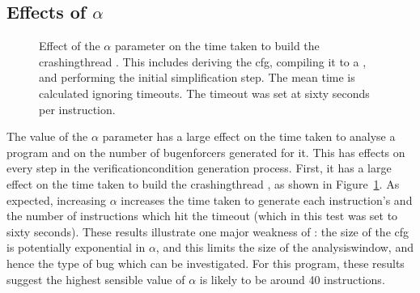 

\subsection{Effects of $\alpha$}



\begin{figure}
  
  \caption{Effect of the $\alpha$ parameter on the time taken to build
    the \gls{crashingthread} {\StateMachines}.  This includes deriving
    the \gls{cfg}, compiling it to a {\StateMachine}, and performing
    the initial simplification step.  The mean time is calculated
    ignoring timeouts.  The timeout was set at sixty seconds per
    instruction.}
  \label{fig:perf:alpha:bpm:unopt}
\end{figure}

The value of the $\alpha$ parameter has a large effect on the time
taken to analyse a program and on the number of \glspl{bugenforcer}
generated for it.  This has effects on every step in the
\gls{verificationcondition} generation process.  First, it has a large
effect on the time taken to build the \gls{crashingthread}
{\StateMachines}, as shown in Figure~\ref{fig:perf:alpha:bpm:unopt}.  As
expected, increasing $\alpha$ increases the time taken to generate
each instruction's {\StateMachine} and the number of instructions
which hit the timeout (which in this test was set to sixty seconds).
These results illustrate one major weakness of {\technique}: the size
of the \gls{cfg} is potentially exponential in $\alpha$, and this
limits the size of the \gls{analysiswindow}, and hence the type of bug
which can be investigated.  For this program, these results suggest
the highest sensible value of $\alpha$ is likely to be around 40
instructions.

